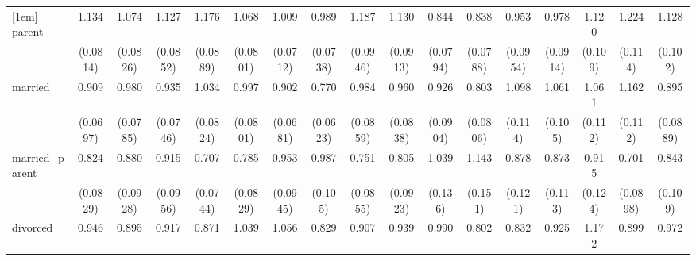{\begin{tabular}{l*{16}{c}}
[1em]
parent              &       1.134         &       1.074         &       1.127         &       1.176\sym{*}  &       1.068         &       1.009         &       0.989         &       1.187\sym{*}  &       1.130         &       0.844         &       0.838         &       0.953         &       0.978         &       1.120         &       1.224\sym{*}  &       1.128         \\
                    &    (0.0814)         &    (0.0826)         &    (0.0852)         &    (0.0889)         &    (0.0801)         &    (0.0712)         &    (0.0738)         &    (0.0946)         &    (0.0913)         &    (0.0794)         &    (0.0788)         &    (0.0954)         &    (0.0914)         &     (0.109)         &     (0.114)         &     (0.102)         \\
[1em]
married             &       0.909         &       0.980         &       0.935         &       1.034         &       0.997         &       0.902         &       0.770\sym{**} &       0.984         &       0.960         &       0.926         &       0.803\sym{*}  &       1.098         &       1.061         &       1.061         &       1.162         &       0.895         \\
                    &    (0.0697)         &    (0.0785)         &    (0.0746)         &    (0.0824)         &    (0.0801)         &    (0.0681)         &    (0.0623)         &    (0.0859)         &    (0.0838)         &    (0.0904)         &    (0.0806)         &     (0.114)         &     (0.105)         &     (0.112)         &     (0.112)         &    (0.0889)         \\
[1em]
married\_parent      &       0.824         &       0.880         &       0.915         &       0.707\sym{***}&       0.785\sym{*}  &       0.953         &       0.987         &       0.751\sym{*}  &       0.805         &       1.039         &       1.143         &       0.878         &       0.873         &       0.915         &       0.701\sym{**} &       0.843         \\
                    &    (0.0829)         &    (0.0928)         &    (0.0956)         &    (0.0744)         &    (0.0829)         &    (0.0945)         &     (0.105)         &    (0.0855)         &    (0.0923)         &     (0.136)         &     (0.151)         &     (0.121)         &     (0.113)         &     (0.124)         &    (0.0898)         &     (0.109)         \\
[1em]
divorced            &       0.946         &       0.895         &       0.917         &       0.871         &       1.039         &       1.056         &       0.829         &       0.907         &       0.939         &       0.990         &       0.802         &       0.832         &       0.925         &       1.172         &       0.899         &       0.972         \\

\end{tabular}}

